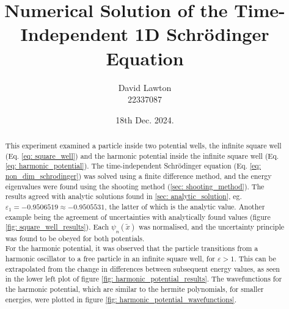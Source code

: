 \documentclass[10pt,a4paper]{article}
\title{Numerical Solution of the Time-Independent 1D Schr\"{o}dinger Equation}
\author{David Lawton\\
        22337087}
\date{18th Dec. 2024.}
\theoremstyle{definition}
\theoremstyle{remark}
\begin{document}
\maketitle

\tableofcontents
{}
\begin{abstract}
This experiment examined a particle inside two potential wells, the infinite square well (Eq. \ref{eq: square_well}) and the harmonic potential inside the infinite square well (Eq. \ref{eq: harmonic_potential}). The time-independent Schr\"{o}dinger equation (Eq. \ref{eq: non_dim_schrodinger}) was solved using a finite difference method, and the energy eigenvalues were found using the shooting method (\ref{sec: shooting_method}). The results agreed with analytic solutions found in \ref{sec: analytic_solution}, eg. $\varepsilon_1 = -0.9506519\approx -0.9505531$, the latter of which is the analytic value. Another example being the agreement of uncertainties with analytically found values (figure \ref{fig: square_well_results}). Each $\psi_n(\tilde{x})$ was normalised, and the uncertainty principle was found to be obeyed for both potentials.\\
\indent For the harmonic potential, it was observed that the particle transitions from a harmonic oscillator to a free particle in an infinite square well, for $\varepsilon > 1$. This can be extrapolated from the change in differences between subsequent energy values, as seen in the lower left plot of figure \ref{fig: harmonic_potential_results}. The wavefunctions for the harmonic potential, which are similar to the hermite polynomials, for smaller energies, were plotted in figure \ref{fig: harmonic_potential_wavefunctions}.
\end{abstract}
\end{document}

